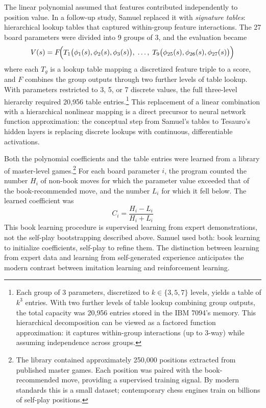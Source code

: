 The linear polynomial assumed that features contributed independently to position value. In a follow-up study, Samuel replaced it with \emph{signature tables}: hierarchical lookup tables that captured within-group feature interactions. The 27 board parameters were divided into 9 groups of 3, and the evaluation became
\begin{equation}
V(s) = F\!\Bigl(T_1\bigl(\phi_1(s), \phi_2(s), \phi_3(s)\bigr),\; \ldots,\; T_9\bigl(\phi_{25}(s), \phi_{26}(s), \phi_{27}(s)\bigr)\Bigr)
\end{equation}
where each $T_g$ is a lookup table mapping a discretized feature triple to a score, and $F$ combines the group outputs through two further levels of table lookup. With parameters restricted to 3, 5, or 7 discrete values, the full three-level hierarchy required 20{,}956 table entries.\footnote{Each group of 3 parameters, discretized to $k \in \{3, 5, 7\}$ levels, yields a table of $k^3$ entries. With two further levels of table lookup combining group outputs, the total capacity was 20{,}956 entries stored in the IBM 7094's memory. This hierarchical decomposition can be viewed as a factored function approximation: it captures within-group interactions (up to 3-way) while assuming independence across groups.} This replacement of a linear combination with a hierarchical nonlinear mapping is a direct precursor to neural network function approximation: the conceptual step from Samuel's tables to Tesauro's hidden layers is replacing discrete lookups with continuous, differentiable activations.

Both the polynomial coefficients and the table entries were learned from a library of master-level games.\footnote{The library contained approximately 250{,}000 positions extracted from published master games. Each position was paired with the book-recommended move, providing a supervised training signal. By modern standards this is a small dataset; contemporary chess engines train on billions of self-play positions.} For each board parameter $i$, the program counted the number $H_i$ of non-book moves for which the parameter value exceeded that of the book-recommended move, and the number $L_i$ for which it fell below. The learned coefficient was
\begin{equation}
C_i = \frac{H_i - L_i}{H_i + L_i}
\end{equation}
This book learning procedure is supervised learning from expert demonstrations, not the self-play bootstrapping described above. Samuel used both: book learning to initialize coefficients, self-play to refine them. The distinction between learning from expert data and learning from self-generated experience anticipates the modern contrast between imitation learning and reinforcement learning.

